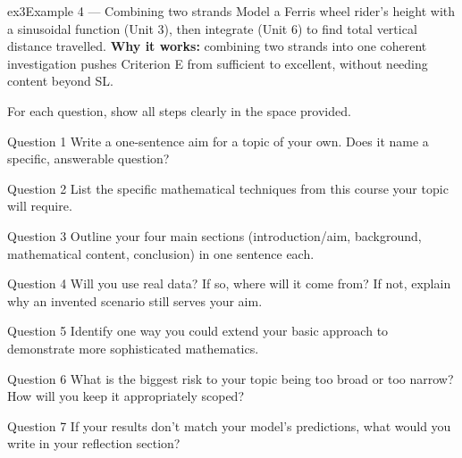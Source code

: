 \documentclass[11pt]{article}
\begin{document}
\begin{example}{ex3}{Example 4 --- Combining two strands}
Model a Ferris wheel rider's height with a sinusoidal function (Unit 3), then integrate (Unit 6) to find total vertical distance travelled.\soln
\textbf{Why it works:} combining two strands into one coherent investigation pushes Criterion E from sufficient to excellent, without needing content beyond SL.
\end{example}

\clearpage
{}
For each question, show all steps clearly in the space provided.

\begin{qbox}{Question 1}
Write a one-sentence aim for a topic of your own. Does it name a specific, answerable question?\workspace{3.4cm}
\end{qbox}

\begin{qbox}{Question 2}
List the specific mathematical techniques from this course your topic will require.\workspace{3.4cm}
\end{qbox}

\begin{qbox}{Question 3}
Outline your four main sections (introduction/aim, background, mathematical content, conclusion) in one sentence each.\workspace{4.4cm}
\end{qbox}

\begin{qbox}{Question 4}
Will you use real data? If so, where will it come from? If not, explain why an invented scenario still serves your aim.\workspace{3.4cm}
\end{qbox}

\begin{qbox}{Question 5}
Identify one way you could extend your basic approach to demonstrate more sophisticated mathematics.\workspace{3.4cm}
\end{qbox}

\begin{qbox}{Question 6}
What is the biggest risk to your topic being too broad or too narrow? How will you keep it appropriately scoped?\workspace{3.4cm}
\end{qbox}

\begin{qbox}{Question 7}
If your results don't match your model's predictions, what would you write in your reflection section?\workspace{3.4cm}
\end{qbox}
\end{document}
